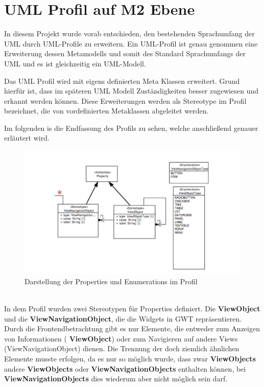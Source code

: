 \chapter{UML Profil auf M2 Ebene}
\label{UMLProfil}
In diesem Projekt wurde vorab entschieden, den bestehenden Sprachumfang der UML durch UML-Profile zu erweitern. Ein UML-Profil ist genau genommen eine Erweiterung dessen Metamodells und somit des Standard Sprachumfangs der UML und es ist gleichzeitig ein UML-Modell.

Das UML Profil wird mit eigens definierten Meta Klassen erweitert. Grund hierfür ist, dass im späteren UML Modell Zuständigkeiten besser zugewiesen und erkannt werden können.
Diese Erweiterungen werden als Stereotype im Profil bezeichnet, die von vordefinierten Metaklassen abgeleitet werden.

Im folgenden is die Endfassung des Profils zu sehen, welche anschließend genauer erläutert wird.
\begin{figure}[htbp]
\begin{center}
\includegraphics[width=\textwidth]{./img/ProfilProp.pdf}
\caption{Darstellung der Properties und Enumerations im
Profil}\label{Fig:UMLProfilProp}
\end{center}
\end{figure}\\
In dem Profil wurden zwei Stereotypen für Properties definiert. Die \textbf{ViewObject} und die \textbf{ViewNavigationObject}, die die Widgets in GWT repräsentieren. Durch die Frontendbetrachtung gibt es nur Elemente, die entweder zum Anzeigen von Informationen ( \textbf{ViewObject}) oder zum Navigieren auf andere Views (ViewNavigationObject) dienen. Die Trennung der doch ziemlich ähnlichen Elemente musste erfolgen, da es nur so möglich wurde, dass zwar  \textbf{ViewObjects} andere  \textbf{ViewObjects} oder  \textbf{ViewNavigationObjects} enthalten können, bei  \textbf{ViewNavigationObjects} dies wiederum aber nicht möglich sein darf. 
